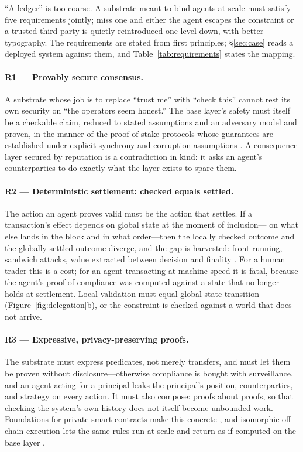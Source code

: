\documentclass[11pt]{article}
\newcommand{\R}[1]{R#1}
\begin{document}
``A ledger'' is too coarse. A substrate meant to bind agents at scale
must satisfy five requirements jointly; miss one and either the agent
escapes the constraint or a trusted third party is quietly reintroduced
one level down, with better typography. The requirements are stated from
first principles; \S\ref{sec:case} reads a deployed system against them,
and Table~\ref{tab:requirements} states the mapping.

\paragraph{\R{1} --- Provably secure consensus.}
A substrate whose job is to replace ``trust me'' with ``check this''
cannot rest its own security on ``the operators seem honest.'' The base
layer's safety must itself be a checkable claim, reduced to stated
assumptions and an adversary model and proven, in the manner of the
proof-of-stake protocols whose guarantees are established under explicit
synchrony and corruption assumptions
\citep{kiayias2017ouroboros,david2018praos}. A consequence layer secured
by reputation is a contradiction in kind: it asks an agent's
counterparties to do exactly what the layer exists to spare them.

\paragraph{\R{2} --- Deterministic settlement: checked equals settled.}
The action an agent proves valid must be the action that settles. If a
transaction's effect depends on global state at the moment of inclusion---
on what else lands in the block and in what order---then the locally
checked outcome and the globally settled outcome diverge, and the gap is
harvested: front-running, sandwich attacks, value extracted between
decision and finality \citep{daian2020flashboys}. For a human trader this
is a cost; for an agent transacting at machine speed it is fatal, because
the agent's proof of compliance was computed against a state that no
longer holds at settlement. Local validation must equal global state
transition (Figure~\ref{fig:delegation}b), or the constraint is checked
against a world that does not arrive.

\paragraph{\R{3} --- Expressive, privacy-preserving proofs.}
The substrate must express predicates, not merely transfers, and must let
them be proven without disclosure---otherwise compliance is bought with
surveillance, and an agent acting for a principal leaks the principal's
position, counterparties, and strategy on every action. It must also
compose: proofs about proofs, so that checking the system's own history
does not itself become unbounded work. Foundations for private smart
contracts make this concrete \citep{kerber2021kachina}, and isomorphic
off-chain execution lets the same rules run at scale and return as if
computed on the base layer \citep{chakravarty2021hydra}.
\end{document}
